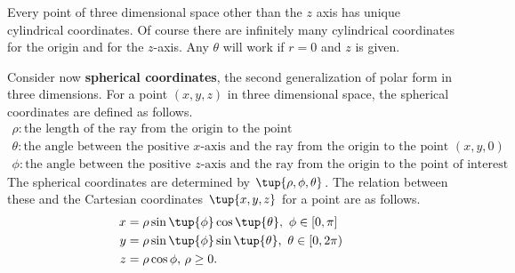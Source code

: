 \begin{center}
\end{center}

 Every point of three dimensional
space other than the $z$ axis  has  unique cylindrical coordinates. Of course there are infinitely many cylindrical coordinates for the
origin and for the $z$-axis. Any $\theta $ will work if $r=0$ and $z$ is given.  

Consider now \textbf{spherical coordinates}, the second generalization of polar form in three dimensions. For a point $(x,y,z)$ in three dimensional space, the spherical coordinates are defined as follows.
\begin{equation*}
\begin{array}{l}
\rho: \mbox{the length of the ray from the origin to the point}\\
\theta: \mbox{the angle between the positive $x$-axis and the ray from the origin to the point $(x,y,0)$}\\
\phi: \mbox{the angle between the positive $z$-axis and the ray from the origin to the point of interest}
\end{array}
\end{equation*}
The spherical coordinates are determined by $\tup{\rho ,\phi
,\theta } $. The relation between these and the Cartesian coordinates $\tup{x,y,z }$ for a point
are as follows.  
\begin{align*}
x& =\rho \sin \tup{\phi } \cos \tup{\theta } ,\ \phi \in 
\left[ 0,\pi \right]  \\
y& =\rho \sin \tup{\phi } \sin \tup{\theta } ,\text{ }\theta
\in \lbrack 0,2\pi ) \\
z& =\rho \cos \phi \text{, }\rho \geq 0.
\end{align*}

